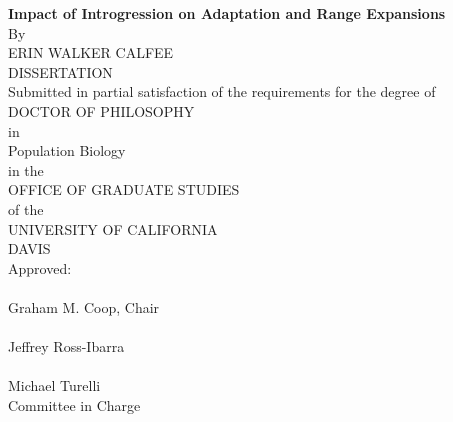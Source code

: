 \begin{center}
   \null
   \textbf{%
      Impact of Introgression on Adaptation and Range Expansions
   }%
   \\
   \bigskip
   By \\
   \bigskip
   ERIN WALKER CALFEE \\
   DISSERTATION \\
   \bigskip
   Submitted in partial satisfaction of the requirements for the
   degree of \\
   \bigskip
   DOCTOR OF PHILOSOPHY \\
   \bigskip
   in \\
   \bigskip
   Population Biology \\
   \bigskip
   in the \\
   \bigskip
   OFFICE OF GRADUATE STUDIES \\
   \bigskip        
   of the \\
   \bigskip
   UNIVERSITY OF CALIFORNIA \\
   \bigskip
   DAVIS \\
   \bigskip
   Approved: \\
   \bigskip
   \bigskip
   \makebox[3in]{\hrulefill} \\
   Graham M. Coop, Chair \\
   \bigskip
   \bigskip
   \makebox[3in]{\hrulefill} \\
   Jeffrey Ross-Ibarra \\
   \bigskip
   \bigskip
   \makebox[3in]{\hrulefill} \\
   Michael Turelli \\
   \bigskip
   Committee in Charge \\
    \\
   \vfill
\end{center}
